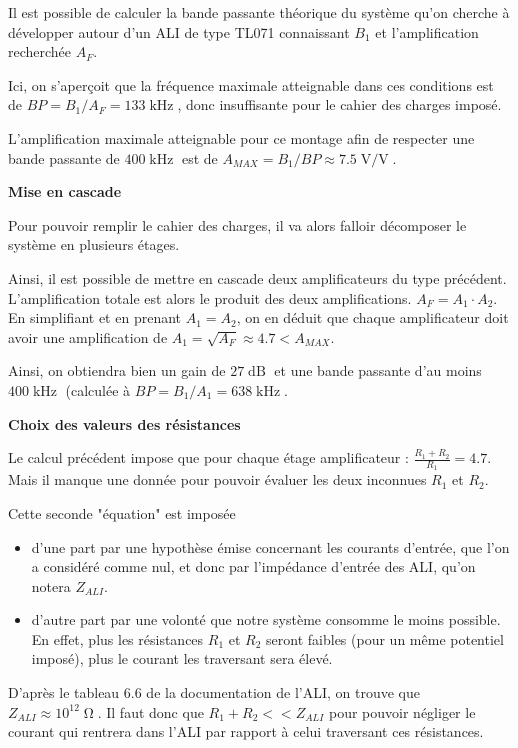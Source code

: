 \documentclass[a4paper,french]{paper}
\begin{document}
\medskip

Il est possible de calculer la bande passante théorique du système qu'on cherche à développer autour d'un ALI de type TL071 connaissant $B_1$ et l'amplification recherchée $A_F$.

Ici, on s'aperçoit que la fréquence maximale atteignable dans ces conditions est de $BP = B_1 / A_F = 133\operatorname{kHz}$, donc insuffisante pour le cahier des charges imposé.

L'amplification maximale atteignable pour ce montage afin de respecter une bande passante de $400\operatorname{kHz}$ est de $A_{MAX} = B_1 / BP \approx 7.5\operatorname{V/V}$.

\medskip

\textbf{Mise en cascade}

Pour pouvoir remplir le cahier des charges, il va alors falloir décomposer le système en plusieurs étages.

Ainsi, il est possible de mettre en cascade deux amplificateurs du type précédent. L'amplification totale est alors le produit des deux amplifications. $A_F = A_1 \cdot A_2$. En simplifiant et en prenant $A_1 = A_2$, on en déduit que chaque amplificateur doit avoir une amplification de $A_1 = \sqrt{A_F} \approx 4.7 < A_{MAX}$.

Ainsi, on obtiendra bien un gain de $27\operatorname{dB}$ et une bande passante d'au moins $400\operatorname{kHz}$ (calculée à $BP = B_1 / A_1 = 638\operatorname{kHz}$.

\medskip

\textbf{Choix des valeurs des résistances}

Le calcul précédent impose que pour chaque étage amplificateur : $\frac{R_1 + R_2}{R_1} = 4.7$. Mais il manque une donnée pour pouvoir évaluer les deux inconnues $R_1$ et $R_2$.

Cette seconde "équation" est imposée 
\begin{itemize}
	\item d'une part par une hypothèse émise concernant les courants d'entrée, que l'on a considéré comme nul, et donc par l'impédance d'entrée des ALI, qu'on notera $Z_{ALI}$.
	\item d'autre part par une volonté que notre système consomme le moins possible. En effet, plus les résistances $R_1$ et $R_2$ seront faibles (pour un même potentiel imposé), plus le courant les traversant sera élevé.
\end{itemize} 

D'après le tableau 6.6 de la documentation de l'ALI, on trouve que $Z_{ALI} \approx 10^{12}\operatorname{\Omega}$. Il faut donc que $R_1 + R_2 << Z_{ALI}$ pour pouvoir négliger le courant qui rentrera dans l'ALI par rapport à celui traversant ces résistances.
\end{document}
